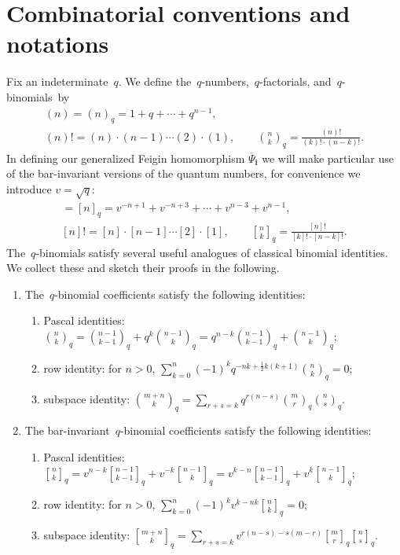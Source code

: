 \section{Combinatorial conventions and notations}\label{sec:combinatorics}

Fix an indeterminate~$q$.
We def\/ine the~$q$-numbers,~$q$-factorials, and~$q$-binomials~by
\begin{gather*}
(n)=(n)_q=1+q+\cdots+q^{n-1},
\\
(n)!=(n)\cdot(n-1)\cdots(2)\cdot(1),
\qquad
{n\choose k}_q=\frac{(n)!}{(k)!\cdot(n-k)!}.
\end{gather*}
In def\/ining our generalized Feigin homomorphism $\overline\Psi_\mathbf{i}$ we will make particular use of the
bar-invariant versions of the quantum numbers, for convenience we introduce $v=\sqrt{q}$:
\begin{gather*}
[n]=[n]_q=v^{-n+1}+v^{-n+3}+\cdots+v^{n-3}+v^{n-1},
\\
[n]!=[n]\cdot[n-1]\cdots[2]\cdot[1],
\qquad
{n\brack k}_q=\frac{[n]!}{[k]!\cdot[n-k]!}.
\end{gather*}
The~$q$-binomials satisfy several useful analogues of classical binomial identities.
We collect these and sketch their proofs in the following.
\begin{Lemma}\label{lem:binomial_identities}\qquad
\begin{enumerate}\itemsep=0pt
\item[$1.$] The~$q$-binomial coefficients satisfy the following identities:
\begin{enumerate}[\upshape (a)]\itemsep=0pt
\item Pascal identities: ${n\choose k}_q={n-1\choose k-1}_q+q^k{n-1\choose k}_q=q^{n-k}{n-1\choose k-1}_q+{n-1\choose k}_q$;
\item row identity: for $n>0$, $\sum\limits_{k=0}^n (-1)^k q^{-nk+\frac{1}{2} k(k+1)}{n\choose k}_q=0$;
\item subspace identity: ${m+n\choose k}_q=\sum\limits_{r+s=k}q^{r(n-s)}{m\choose r}_q{n\choose s}_q$.
\end{enumerate}
\item[$2.$] The bar-invariant~$q$-binomial coefficients satisfy the following identities:
\begin{enumerate}[\upshape (a)]\itemsep=0pt
\item Pascal identities: ${n\brack k}_q=v^{n-k}{n-1\brack k-1}_q+v^{-k}{n-1\brack k}_q=v^{k-n}{n-1\brack k-1}_q+v^k{n-1\brack k}_q$;
\item row identity: for $n>0$, $\sum\limits_{k=0}^n (-1)^k v^{k-nk} {n\brack k}_q=0$;
\item subspace identity: ${m+n\brack k}_q=\sum\limits_{r+s=k}v^{r(n-s)-s(m-r)}{m\brack r}_q{n\brack s}_q$.
\end{enumerate}
\end{enumerate}
\end{Lemma}

